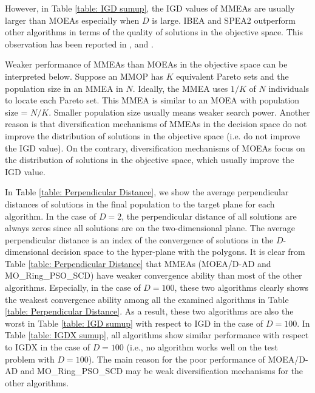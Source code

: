 \documentclass[conference]{IEEEtran}
\begin{document}
 However, in Table \ref{table: IGD sumup}, the IGD values of MMEAs are usually larger than MOEAs especially when $D$ is large. IBEA and SPEA2 outperform other algorithms in terms of the quality of solutions in the objective space. This observation has been reported in \cite{liang2016multimodal}, \cite{tanabe2018decomposition} and \cite{shir2009enhancing}. 
 
 Weaker performance of MMEAs than MOEAs in the objective space can be interpreted below. Suppose an MMOP has $K$ equivalent Pareto sets and the population size in an MMEA in $N$. Ideally, the MMEA uses $1/K$ of $N$ individuals to locate each Pareto set. This MMEA is similar to an MOEA with population size = $N/K$. Smaller population size usually means weaker search power. Another reason is that diversification mechanisms of MMEAs in the decision space do not improve the distribution of solutions in the objective space (i.e. do not improve the IGD value). On the contrary, diversification mechanisms of MOEAs focus on the distribution of solutions in the objective space, which usually improve the IGD value. 
 
 In Table \ref{table: Perpendicular Distance}, we show the average perpendicular distances of solutions in the final population to the target plane for each algorithm. In the case of $D=2$, the perpendicular distance of all solutions are always zeros since all solutions are on the two-dimensional plane. The average perpendicular distance is an index of the convergence of solutions in the $D$-dimensional decision space to the hyper-plane with the polygons. It is clear from Table \ref{table: Perpendicular Distance} that  MMEAs (MOEA/D-AD and MO\_Ring\_PSO\_SCD) have weaker convergence ability than most of the other algorithms. Especially, in the case of $D=100$, these two algorithms clearly shows the weakest convergence ability among all the examined algorithms in Table \ref{table: Perpendicular Distance}. As a result, these two algorithms are also the worst in Table \ref{table: IGD sumup} with respect to IGD in the case of $D = 100$. In Table \ref{table: IGDX sumup}, all algorithms show similar performance with respect to IGDX in the case of $D=100$ (i.e., no algorithm works well on the test problem with $D=100$). The main reason for the poor performance of MOEA/D-AD and MO\_Ring\_PSO\_SCD may be weak diversification mechanisms for the other algorithms.
\end{document}
